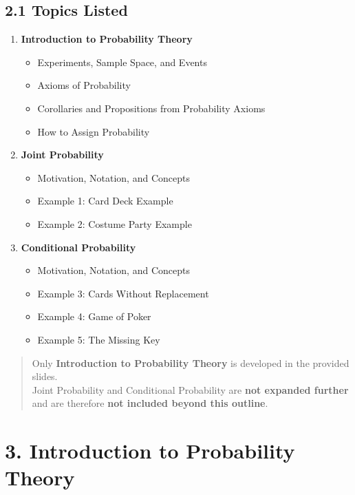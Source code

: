\documentclass[12pt]{article}
\begin{document}
\subsection*{2.1 Topics Listed}

\begin{enumerate}
  \item \textbf{Introduction to Probability Theory}
  \begin{itemize}
    \item Experiments, Sample Space, and Events
    \item Axioms of Probability
    \item Corollaries and Propositions from Probability Axioms
    \item How to Assign Probability
  \end{itemize}

  \item \textbf{Joint Probability}
  \begin{itemize}
    \item Motivation, Notation, and Concepts
    \item Example 1: Card Deck Example
    \item Example 2: Costume Party Example
  \end{itemize}

  \item \textbf{Conditional Probability}
  \begin{itemize}
    \item Motivation, Notation, and Concepts
    \item Example 3: Cards Without Replacement
    \item Example 4: Game of Poker
    \item Example 5: The Missing Key
  \end{itemize}
\end{enumerate}

\begin{quote}
Only \textbf{Introduction to Probability Theory} is developed in the provided slides.\\
Joint Probability and Conditional Probability are \textbf{not expanded further} and are therefore \textbf{not included beyond this outline}.
\end{quote}

\section*{3. Introduction to Probability Theory}
\end{document}

